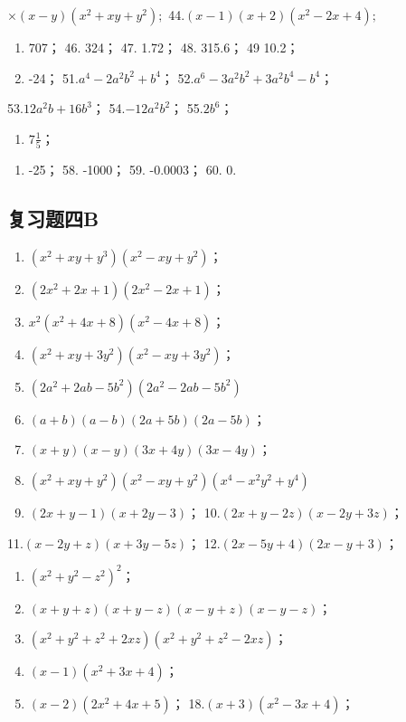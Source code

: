\(\times(x-y)(x^{2}+xy+y^{2});\) 44.\((x-1)(x+2)(x^{2}-2x+4);\)

\begin{enumerate}[start=45]
\item
  707； 46. 324； 47. 1.72； 48. 315.6； 49 10.2；
\item
  -24； 51.\(a^4 - 2a^2b^2 + b^4\)；
  52.\(a^6 - 3a^2b^2 + 3a^2b^4 - b^4\)；
\end{enumerate}

53.\(12a^{2}b + 16b^{3}\)； 54.\(-12a^{2}b^{2}\)； 55.\(2b^{6}\)；
\begin{enumerate}[start=56]
\item
  \(7\frac{1}{5}\)；
\end{enumerate}

\begin{enumerate}[start=57]
\item
  -25； 58. -1000； 59. -0.0003； 60. 0.
\end{enumerate}

\subsection{复习题四B}

\begin{enumerate}[start=1]
\item
  \((x^{2} + xy + y^{3})(x^{2} - xy + y^{2})\)；
\item
  \((2x^{2} + 2x + 1)(2x^{2} - 2x + 1)\)；
\item
  \(x^{2}(x^{2} + 4x + 8)(x^{2} - 4x + 8)\)；
\item
  \((x^{2} + xy + 3y^{2})(x^{2} - xy + 3y^{2})\)；
\item
  \((2a^{2} + 2ab - 5b^{2})(2a^{2} - 2ab - 5b^{2})\)
\item
  \((a + b)(a - b)(2a + 5b)(2a - 5b)\)；
\item
  \((x + y)(x - y)(3x + 4y)(3x - 4y)\)；
\item
  \((x^{2} + xy + y^{2})(x^{2} - xy + y^{2})(x^{4} - x^{2}y^{2} + y^{4})\)
\item
  \((2x + y - 1)(x + 2y - 3)\)； 10.\((2x + y - 2z)(x - 2y + 3z)\)；
\end{enumerate}

11.\((x - 2y + z)(x + 3y - 5z)\)； 12.\((2x - 5y + 4)(2x - y + 3)\)；

\begin{enumerate}[start=13]
\item
  \((x^{2} + y^{2} - z^{2})^{2}\)；
\item
  \((x + y + z)(x + y - z)(x - y + z)(x - y - z)\)；
\item
  \((x^{2} + y^{2} + z^{2} + 2xz)(x^{2} + y^{2} + z^{2} - 2xz)\)；
\item
  \((x - 1)(x^{2} + 3x + 4)\)；
\item
  \((x - 2)(2x^{2} + 4x + 5)\)； 18.\((x + 3)(x^{2} - 3x + 4)\)；
\end{enumerate}

